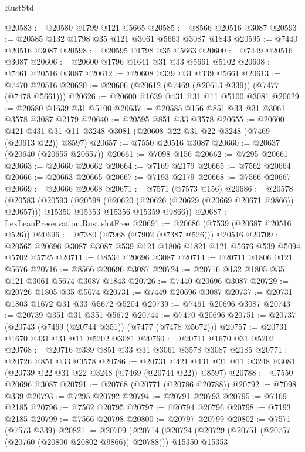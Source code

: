 \begin{lexlean}{RustStd}
\begin{coremodule}
@20583 := @20580 @1799 @121 @5665
@20585 := @8566 @20516 @3087
@20593 := @20585 @132 @1798 @35 @121 @3061 @5663 @3087 @1843
@20595 := @7440 @20516 @3087
@20598 := @20595 @1798 @35 @5663
@20600 := @7449 @20516 @3087
@20606 := @20600 @1796 @1641 @31 @33 @5661 @5102
@20608 := @7461 @20516 @3087
@20612 := @20608 @339 @31 @339 @5661
@20613 := @7470 @20516
@20620 := @20606 (@20612 (@7469 (@20613 @339)) (@7477 (@7478 @5661)))
@20626 := @20600 @1639 @431 @31 @11 @5100 @3081
@20629 := @20580 @1639 @31 @5100
@20637 := @20585 @156 @851 @33 @31 @3061 @3578 @3087 @2179
@20640 := @20595 @851 @33 @3578
@20655 := @20600 @421 @431 @31 @11 @3248 @3081 (@20608 @22 @31 @22 @3248 (@7469 (@20613 @22)) @8597)
@20657 := @7550 @20516 @3087
@20660 := @20637 (@20640 (@20655 @20657))
@20661 := @7098 @156
@20662 := @7295 @20661
@20663 := @20660 @20662
@20664 := @7169 @2179
@20665 := @7562 @20664
@20666 := @20663 @20665
@20667 := @7193 @2179
@20668 := @7566 @20667
@20669 := @20666 @20668
@20671 := @7571 (@7573 @156)
@20686 := @20578
    (@20583
      (@20593
        (@20598 (@20620 (@20626 (@20629 (@20669 @20671 @9866)) @20657)))
        @15350
        @15353
        @15356
        @15359
        @9866))
@20687 := LexLeanPreservation.Rust.slotFree
@20691 := @20686 (@7539 (@20687 @20516 @526))
@20696 := @7380 (@7968 (@7902 (@7387 @526))) @20516
@20709 := @20565 @20696 @3087 @3087 @539 @121 @1806 @1821 @121 @5676 @539 @5094 @5702 @5725
@20711 := @8534 @20696 @3087
@20714 := @20711 @1806 @121 @5676
@20716 := @8566 @20696 @3087
@20724 := @20716 @132 @1805 @35 @121 @3061 @5674 @3087 @1843
@20726 := @7440 @20696 @3087
@20729 := @20726 @1805 @35 @5674
@20731 := @7449 @20696 @3087
@20737 := @20731 @1803 @1672 @31 @33 @5672 @5204
@20739 := @7461 @20696 @3087
@20743 := @20739 @351 @31 @351 @5672
@20744 := @7470 @20696
@20751 := @20737 (@20743 (@7469 (@20744 @351)) (@7477 (@7478 @5672)))
@20757 := @20731 @1670 @431 @31 @11 @5202 @3081
@20760 := @20711 @1670 @31 @5202
@20768 := @20716 @339 @851 @33 @31 @3061 @3578 @3087 @2185
@20771 := @20726 @851 @33 @3578
@20786 := @20731 @421 @431 @31 @11 @3248 @3081 (@20739 @22 @31 @22 @3248 (@7469 (@20744 @22)) @8597)
@20788 := @7550 @20696 @3087
@20791 := @20768 (@20771 (@20786 @20788))
@20792 := @7098 @339
@20793 := @7295 @20792
@20794 := @20791 @20793
@20795 := @7169 @2185
@20796 := @7562 @20795
@20797 := @20794 @20796
@20798 := @7193 @2185
@20799 := @7566 @20798
@20800 := @20797 @20799
@20802 := @7571 (@7573 @339)
@20821 := @20709
    (@20714
      (@20724
        (@20729 (@20751 (@20757 (@20760 (@20800 @20802 @9866)) @20788)))
        @15350
        @15353

\end{coremodule}
\end{lexlean}
